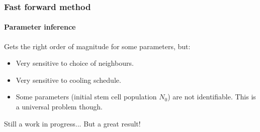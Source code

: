 \documentclass{beamer}
\begin{document}
\begin{frame}
    \frametitle{Fast forward method}
    \framesubtitle{Parameter inference}

Gets the right order of magnitude for some parameters, but:

\begin{itemize}
    \item Very sensitive to choice of neighbours.
    \item Very sensitive to cooling schedule. 
    \item Some parameters (initial stem cell population $N_0$) are not identifiable.
    This is a universal problem though.
\end{itemize}

Still a work in progress... But a great result!
\end{frame}
\end{document}
